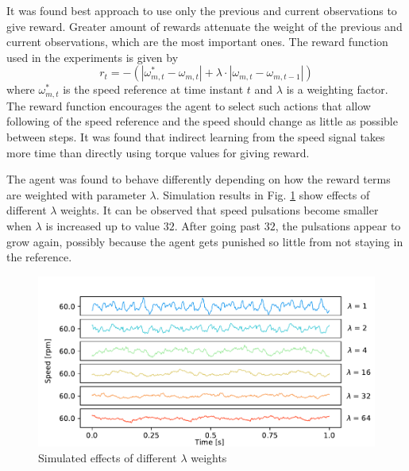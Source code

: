 It was found best approach to use only the previous and current observations to give reward. Greater amount of rewards attenuate the weight of the previous and current observations, which are the most important ones. The reward function used in the experiments is given by
\begin{equation}
    r_t = -(|\omega^{*}_{m, t} - \omega_{m, t}| + \lambda \cdot |\omega_{m, t} - \omega_{m, t-1}|)
    \label{Eq:reward-function}
\end{equation}
where $\omega^{*}_{m, t}$ is the speed reference at time instant $t$ and $\lambda$ is a weighting factor. The reward function encourages the agent to select such actions that allow following of the speed reference and the speed should change as little as possible between steps. It was found that indirect learning from the speed signal takes more time than directly using torque values for giving reward.

The agent was found to behave differently depending on how the reward terms are weighted with parameter $\lambda$. Simulation results in Fig. \ref{fig:lambda} show effects of different $\lambda$ weights. It can be observed that speed pulsations become smaller when $\lambda$ is increased up to value $32$. After going past $32$, the pulsations appear to grow again, possibly because the agent gets punished so little from not staying in the reference.
\begin{figure}[htb] 
    \centering
    \includegraphics[width=\textwidth]{images/lambda_multiplier.pdf}
    \caption{Simulated effects of different $\lambda$ weights}
    \label{fig:lambda}
\end{figure}

